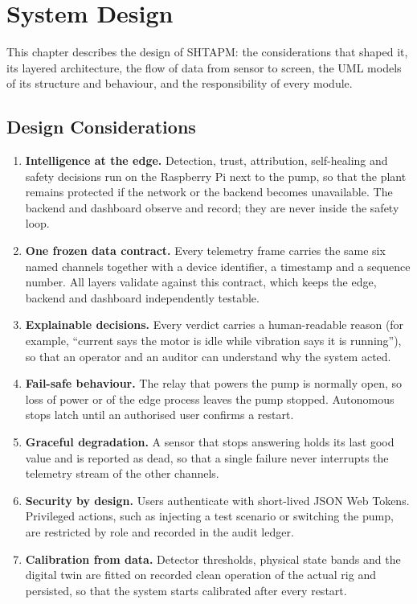 \chapter{System Design}
\label{ch:design}

This chapter describes the design of SHTAPM: the considerations that shaped it, its layered architecture, the flow of data from sensor to screen, the UML models of its structure and behaviour, and the responsibility of every module.


\section{Design Considerations}

\begin{enumerate}
  \item \textbf{Intelligence at the edge.} Detection, trust, attribution, self-healing and safety decisions run on the Raspberry Pi next to the pump, so that the plant remains protected if the network or the backend becomes unavailable. The backend and dashboard observe and record; they are never inside the safety loop.
  \item \textbf{One frozen data contract.} Every telemetry frame carries the same six named channels together with a device identifier, a timestamp and a sequence number. All layers validate against this contract, which keeps the edge, backend and dashboard independently testable.
  \item \textbf{Explainable decisions.} Every verdict carries a human-readable reason (for example, ``current says the motor is idle while vibration says it is running''), so that an operator and an auditor can understand why the system acted.
  \item \textbf{Fail-safe behaviour.} The relay that powers the pump is normally open, so loss of power or of the edge process leaves the pump stopped. Autonomous stops latch until an authorised user confirms a restart.
  \item \textbf{Graceful degradation.} A sensor that stops answering holds its last good value and is reported as dead, so that a single failure never interrupts the telemetry stream of the other channels.
  \item \textbf{Security by design.} Users authenticate with short-lived JSON Web Tokens. Privileged actions, such as injecting a test scenario or switching the pump, are restricted by role and recorded in the audit ledger.
  \item \textbf{Calibration from data.} Detector thresholds, physical state bands and the digital twin are fitted on recorded clean operation of the actual rig and persisted, so that the system starts calibrated after every restart.
\end{enumerate}

